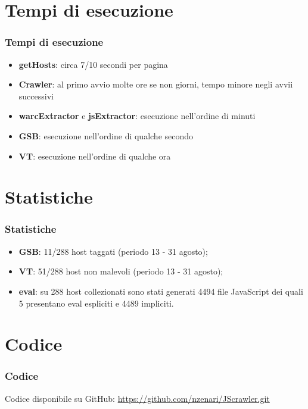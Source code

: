 \documentclass[aspectratio=169]{beamer}
\begin{document}
\section{Tempi di esecuzione}
\begin{frame}
\frametitle{Tempi di esecuzione}
\begin{itemize}
      \item \textbf{getHosts}: circa 7/10 secondi per pagina
      \item \textbf{Crawler}: al primo avvio molte ore se non giorni, tempo minore negli avvii successivi
      \item \textbf{warcExtractor} e \textbf{jsExtractor}: esecuzione nell'ordine di minuti
      \item \textbf{GSB}: esecuzione nell'ordine di qualche secondo
      \item \textbf{VT}: esecuzione nell'ordine di qualche ora
   \end{itemize}
   \end{frame}

\section{Statistiche}
\begin{frame}
\frametitle{Statistiche}
\begin{itemize}
      \item \textbf{GSB}: 11/288 host taggati (periodo 13 - 31 agosto);
      \item \textbf{VT}: 51/288 host non malevoli (periodo 13 - 31 agosto);
      \item \textbf{eval}: su 288 host collezionati sono stati generati 4494 file JavaScript dei quali 5 presentano eval espliciti e 4489 impliciti.
   \end{itemize}
   \end{frame}

\section{Codice}
\begin{frame}
\frametitle{Codice}
Codice disponibile su GitHub: \url{https://github.com/nzenari/JScrawler.git}
   \end{frame}
\end{document}
